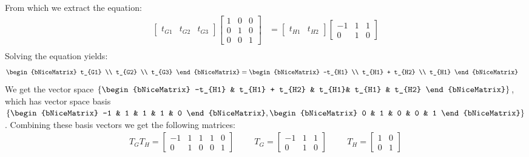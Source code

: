 From which we extract the equation:
\begin{align*}
	 \begin{bmatrix} t_{G1} & t_{G2} & t_{G3}\end{bmatrix}\begin{bmatrix} 1 & 0 & 0 \\ 0 & 1 & 0 \\0 & 0 & 1 \end{bmatrix} &= \begin{bmatrix} t_{H1} & t_{H2} \end{bmatrix}\begin{bmatrix} -1 & 1 & 1 \\ 0 & 1 & 0 \end{bmatrix} \\
\end{align*}
Solving the equation yields: 
\begin{align*}
		 \begin{bNiceMatrix} t_{G1} \\ t_{G2} \\ t_{G3} \end{bNiceMatrix} &= \begin{bNiceMatrix} -t_{H1} \\ t_{H1} + t_{H2} \\ t_{H1} \end{bNiceMatrix}
\end{align*}
We get the vector space $\{ \begin{bNiceMatrix} -t_{H1} & t_{H1} + t_{H2} & t_{H1}&  t_{H1} & t_{H2} \end{bNiceMatrix}  \}$, which has vector space basis $\{ \begin{bNiceMatrix} -1 & 1 & 1 &  1 & 0 \end{bNiceMatrix}, \begin{bNiceMatrix} 0 & 1 & 0 & 0 & 1 \end{bNiceMatrix} \}$. Combining these basis vectors we get the following matrices: 
\begin{align*}
	T_GT_H = \begin{bmatrix}  -1 & 1 & 1 & 1 & 0 \\ 0 & 1 & 0 & 0 & 1\end{bmatrix}\hspace{1cm} T_G = \begin{bmatrix}  -1 & 1 & 1 \\ 0 & 1 & 0\end{bmatrix} \hspace{1cm} T_H = \begin{bmatrix}  1 & 0 \\  0 & 1\end{bmatrix}
\end{align*}
